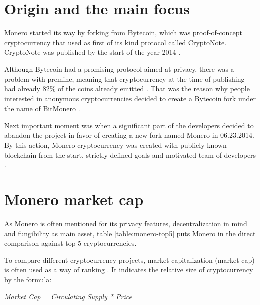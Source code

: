 \documentclass[
  printed, %
  table,   %
  nolof,     %
  nolot,     %
           oneside, color
]{fithesis3}
\begin{document}
\section{Origin and the main focus}
Monero started its way by forking from Bytecoin, which was proof-of-concept cryptocurrency that used as first of its kind protocol called CryptoNote. CryptoNote was published by the start of the year 2014 \cite{githubbytecoin}.

Although Bytecoin had a promising protocol aimed at privacy, there was a problem with premine, meaning that cryptocurrency at the time of publishing had already 82\% of the coins already emitted \cite{fluffyponyonbytecoin}. That was the reason why people interested in anonymous cryptocurrencies decided to create a Bytecoin fork under the name of BitMonero \cite{bitmonero}. 

Next important moment was when a significant part of the developers decided to abandon the project in favor of creating a new fork named Monero in 06.23.2014. By this action, Monero cryptocurrency was created with publicly known blockchain from the start, strictly defined goals and motivated team of developers \cite{monerofork}.



\section{Monero market cap}
 As Monero is often mentioned for its privacy features, decentralization in mind and fungibility as main asset, table \ref{table:monero-top5} puts Monero in the direct comparison against top 5 cryptocurrencies.

To compare different cryptocurrency projects, market capitalization (market cap) is often used as a way of ranking \cite{elbahrawy2017evolutionary}. It indicates the relative size of cryptocurrency by the formula: \\ \centerline{
 \textit{\textit{Market Cap = Circulating Supply * Price} }}
 
\end{document}
